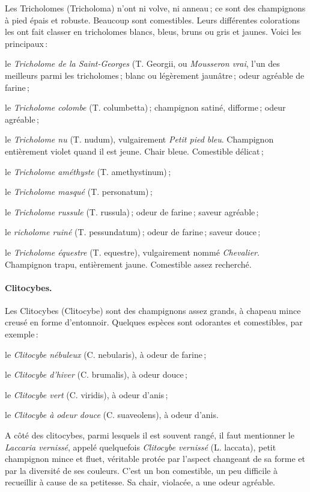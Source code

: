 Les Tricholomes (Tricholoma) n'ont ni volve, ni anneau ; ce sont des
champignons à pied épais et robuste. Beaucoup sont comestibles. Leurs
différentes colorations les ont fait classer en tricholomes blancs, bleus,
bruns ou gris et jaunes. Voici les principaux :

le \textit{Tricholome de la Saint-Georges} (T. Georgii, ou \textit{Mousseron
vrai}, l'un des meilleurs parmi les tricholomes ; blanc ou légèrement
jaunâtre ; odeur agréable de farine ;

le \textit{Tricholome colombe} (T. columbetta) ; champignon satiné, difforme ;
odeur agréable ;

le \textit{Tricholome nu} (T. nudum), vulgairement \textit{Petit pied bleu}.
Champignon entièrement violet quand il est jeune. Chair bleue. Comestible
délicat ;

le \textit{Tricholome améthyste} (T. amethystinum) ;

le \textit{Tricholome masqué} (T. personatum) ;

le \textit{Tricholome russule} (T. russula) ; odeur de farine ; saveur agréable ;

le \textit{richolome ruiné} (T. pessundatum) ; odeur de farine ; saveur douce ;

le \textit{Tricholome équestre} (T. equestre), vulgairement nommé
\textit{Chevalier}. Champignon trapu, entièrement jaune. Comestible assez
recherché.

\paragraph{Clitocybes.}

Les Clitocybes (Clitocybe) sont des champignons assez grands, à chapeau mince
creusé en forme d'entonnoir. Quelques espèces sont odorantes et comestibles,
par exemple :

le \textit{Clitocybe nébuleux} (C. nebularis), à odeur de farine ;

le \textit{Clitocybe d'hiver} (C. brumalis), à odeur douce ;

le \textit{Clitocybe vert} (C. viridis), à odeur d'anis ;

le \textit{Clitocybe à odeur douce} (C. suaveolens), à odeur d’anis.

A côté des clitocybes, parmi lesquels il est souvent rangé, il faut mentionner
le \textit{Laccaria vernissé}, appelé quelquefois \textit{Clitocybe vernissé}
(L. laccata), petit champignon mince et fluet, véritable protée par l'aspect
changeant de sa forme et par la diversité de ses couleurs. C’est un bon
comestible, un peu difficile à recueillir à cause de sa petitesse. Sa chair,
violacée, a une odeur agréable.

